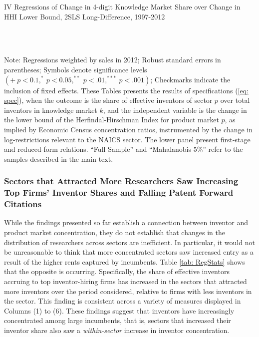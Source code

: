 \begin{table}
\caption{IV Regressions of Change in 4-digit Knowledge Market Share over Change
in HHI Lower Bound, 2SLS Long-Difference, 1997-2012\label{tab: RegIV}}

\begin{centering}
\\
\\
\par\end{centering}
\raggedright{}{\small{}Note: Regressions weighted by sales in 2012;
Robust standard errors in parentheses; Symbols denote significance
levels $\left(+\ p<0.1,^{*}\ p<0.05,^{**}\ p<.01,^{***}\ p<.001\right)$;
Checkmarks indicate the inclusion of fixed effects. These Tables presents
the results of specifications (\ref{eq: spec}), when the outcome
is the share of effective inventors of sector $p$ over total inventors
in knowledge market $k$, and the independent variable is the change
in the lower bound of the Herfindal-Hirschman Index for product market
$p$, as implied by Economic Census concentration ratios, instrumented
by the change in log-restrictions relevant to the NAICS sector. The
lower panel present first-stage and reduced-form relations. ``Full
Sample'' and ``Mahalanobis 5\%'' refer to the samples described
in the main text.}{\small\par}
\end{table}


\subsubsection{Sectors that Attracted More Researchers Saw Increasing Top Firms'
Inventor Shares and Falling Patent Forward Citations}

While the findings presented so far establish a connection between
inventor and product market concentration, they do not establish that
changes in the distribution of researchers across sectors are inefficient.
In particular, it would not be unreasonable to think that more concentrated
sectors saw increased entry as a result of the higher rents captured
by incumbents. Table \ref{tab: RegStats} shows that the opposite
is occurring. Specifically, the share of effective inventors accruing
to top inventor-hiring firms has increased in the sectors that attracted
more inventors over the period considered, relative to firms with
less inventors in the sector. This finding is consistent across a
variety of measures displayed in Columns (1) to (6). These findings
suggest that inventors have increasingly concentrated among large
incumbents, that is, sectors that increased their inventor share also
saw a \emph{within-sector} increase in inventor concentration. 

